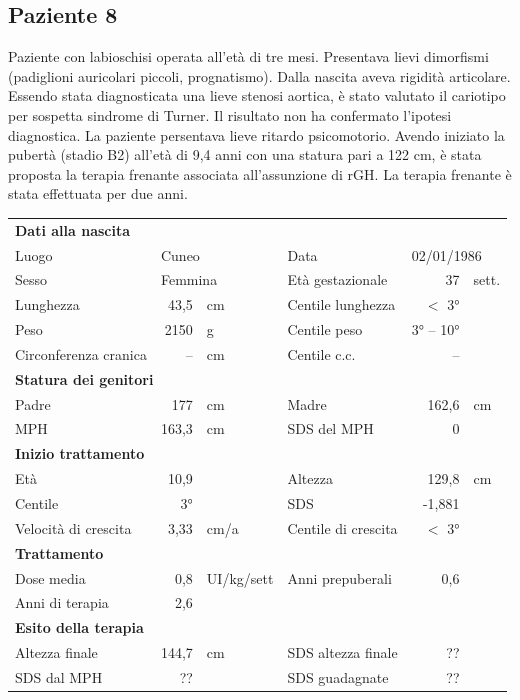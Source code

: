 \subsection*{Paziente 8}%


Paziente con labioschisi operata all'età di tre mesi. Presentava lievi dimorfismi (padiglioni auricolari piccoli, prognatismo). Dalla nascita aveva rigidità articolare. Essendo stata diagnosticata una lieve stenosi aortica, è stato valutato il cariotipo per sospetta sindrome di Turner. Il risultato non ha confermato l'ipotesi diagnostica. La paziente persentava lieve ritardo psicomotorio. 
Avendo iniziato la pubertà (stadio B2) all'età di 9,4 anni con una statura pari a 122 cm, è stata proposta la terapia frenante associata all'assunzione di rGH. La terapia frenante è stata effettuata per due anni.


\begin{table}[!h]
\begin{tabular}{lrllrl}
\toprule
\multicolumn{6}{l}{\textbf{Dati alla nascita}}\\
Luogo 		& \multicolumn{2}{l}{Cuneo} 	& Data 					& \multicolumn{2}{l}{02/01/1986} 	\\
Sesso 		& \multicolumn{2}{l}{Femmina} 	& Età gestazionale 		& 37 		& sett.\\
Lunghezza 	& 43,5 		& cm 				& Centile lunghezza		& $<$ 3° 		\\
Peso 		& 2150 		& g					& Centile peso			& 3° -- 10°		\\
Circonferenza cranica	& -- 		& cm 	& Centile c.c.			& -- \\
\midrule
\multicolumn{6}{l}{\textbf{Statura dei genitori}}\\
Padre 		& 177 & cm 	& Madre 				& 162,6 & cm \\
MPH 		& 163,3 & cm 	& SDS del MPH 			& 0\\
\midrule
\multicolumn{6}{l}{\textbf{Inizio trattamento}} \\
Età	& 10,9 & 		& Altezza 				& 129,8 & cm  \\
Centile & $~$ 3°	 &		& SDS		& -1,881 \\
Velocità di crescita & 3,33 & cm/a	& Centile di crescita & $<$ 3°\\
\midrule
\multicolumn{6}{l}{\textbf{Trattamento}} \\
Dose media		& 0,8 & UI/kg/sett & Anni prepuberali & 0,6\\
Anni di terapia & 2,6\\
\midrule
\multicolumn{6}{l}{\textbf{Esito della terapia}} \\
Altezza finale			& 144,7 & cm 	& SDS altezza finale		& ??\\
SDS dal MPH				& ?? &		& SDS guadagnate 			& ??\\
\bottomrule
\end{tabular}
\end{table}
\clearpage


